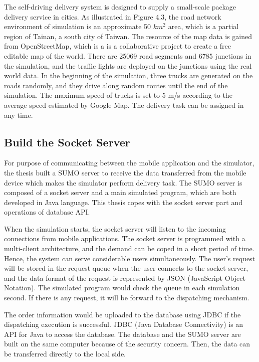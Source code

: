 \documentclass[12pt]{ksthesis}
\begin{document}
\begin{thesis}
{The self-driving delivery system is designed to supply a small-scale package delivery service in cities. As illustrated in Figure 4.3, the road network environment of simulation is an approximate 50 $km^{2}$  area, which is a partial region of Tainan, a south city of Taiwan. The resource of the map data is gained from OpenStreetMap, which is a is a collaborative project to create a free editable map of the world. There are 25069 road segments and 6785 junctions in the simulation, and the traffic lights are deployed on the junctions using the real world data. In the beginning of the simulation, three trucks are generated on the roads randomly, and they drive along random routes until the end of the simulation. The maximum speed of trucks is set to 5 m/s according to the average speed estimated by Google Map. The delivery task can be assigned in any time.


\subsection{Build the Socket Server}
For purpose of communicating between the mobile application and the simulator, the thesis built a SUMO server to receive the data transferred from the mobile device which makes the simulator perform delivery task. The SUMO server is composed of a socket server and a main simulated program, which are both developed in Java language. This thesis copes with the socket server part and operations of database API.

When the simulation starts, the socket server will listen to the incoming connections from mobile applications. The socket server is programmed with a multi-client architecture, and the demand can be coped in a short period of time. Hence, the system can serve considerable users simultaneously. The user’s request will be stored in the request queue when the user connects to the socket server, and the data format of the request is represented by JSON (JavaScript Object Notation). The simulated program would check the queue in each simulation second. If there is any request, it will be forward to the dispatching mechanism. 

The order information would be uploaded to the database using JDBC if the dispatching execution is successful. JDBC (Java Database Connectivity) is an API for Java to access the database. The database and the SUMO server are built on the same computer because of the security concern. Then, the data can be transferred directly to the local side. 

}
\end{thesis}
\end{document}
